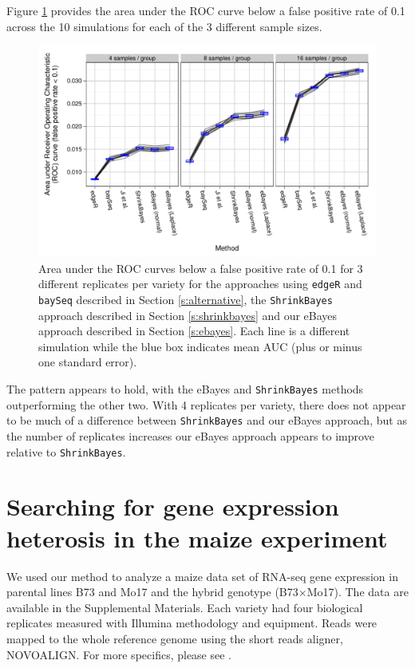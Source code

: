 \documentclass[useAMS,usenatbib,referee]{biom}
\newcommand{\edgeR}{{\tt edgeR}}
\newcommand{\baySeq}{{\tt baySeq}}
\newcommand{\ShrinkBayes}{{\tt ShrinkBayes}}
\newcommand{\RNAseq}{RNA-seq}
\begin{document}
Figure \ref{f:auc} provides the area under the ROC curve below a false positive rate of 0.1 across the 10 simulations for each of the 3 different sample sizes. 
\begin{figure}
\centerline{\includegraphics[width=\textwidth]{auc-facet-TRUE}}
\caption{Area under the ROC curves below a false positive rate of 0.1 for 3 different replicates per variety for the approaches using \edgeR{} and \baySeq{} described in Section \ref{s:alternative}, the \ShrinkBayes{} approach described in Section \ref{s:shrinkbayes} and our eBayes approach described in Section \ref{s:ebayes}. Each line is a different simulation while the blue box indicates mean AUC (plus or minus one standard error).}
\label{f:auc}
\end{figure}
The pattern appears to hold, with the eBayes and \ShrinkBayes{} methods outperforming the other two. With 4 replicates per variety, there does not appear to be much of a difference between \ShrinkBayes{} and our eBayes approach, but as the number of replicates increases our eBayes approach appears to improve relative to \ShrinkBayes{}.



\section{Searching for gene expression heterosis in the maize experiment}
\label{s:maize}

We used our method to analyze a maize data set \citep{paschold2012complementation} of \RNAseq{} gene expression in parental lines B73 and Mo17 and the hybrid genotype (B73$\times$Mo17). The data are available in the Supplemental Materials. Each variety had four biological replicates measured with Illumina methodology and equipment. Reads were mapped to the whole reference genome using the short reads aligner, NOVOALIGN. For more specifics, please see \cite{paschold2012complementation}. 
\end{document}
